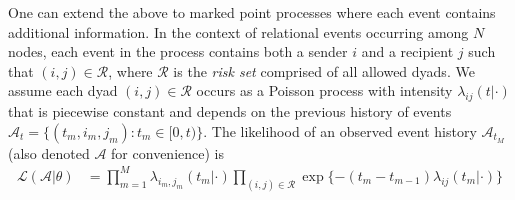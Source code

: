 \documentclass{article}
\begin{document}

One can extend the above to marked point processes where each event contains additional information.  In the context of relational events occurring among $N$ nodes, each event in the process contains both a sender $i$ and a recipient $j$ such that  $(i,j) \in \mathcal{R}$, where $\mathcal{R}$ is the \emph{risk set} comprised of all allowed dyads.  We assume each dyad $(i,j) \in \mathcal{R}$ occurs as a Poisson process with intensity $\lambda_{ij}(t|\cdot)$ that is piecewise constant and depends on the previous history of events  $\mathcal{A}_t = \{(t_m,i_m,j_m): t_m \in [0,t) \}$.  The likelihood of an observed event history $\mathcal{A}_{t_M}$ (also denoted $\mathcal{A}$ for convenience) is
\begin{align}
\mathcal{L}(\mathcal{A}|\theta) &= \prod_{m=1}^M \lambda_{i_m,j_m}(t_m|\cdot) \prod_{(i,j) \in \mathcal{R}}\exp\{ - (t_m - t_{m-1}) \lambda_{ij}(t_m | \cdot) \}
\label{eqn:llk}
\end{align}
\end{document}
